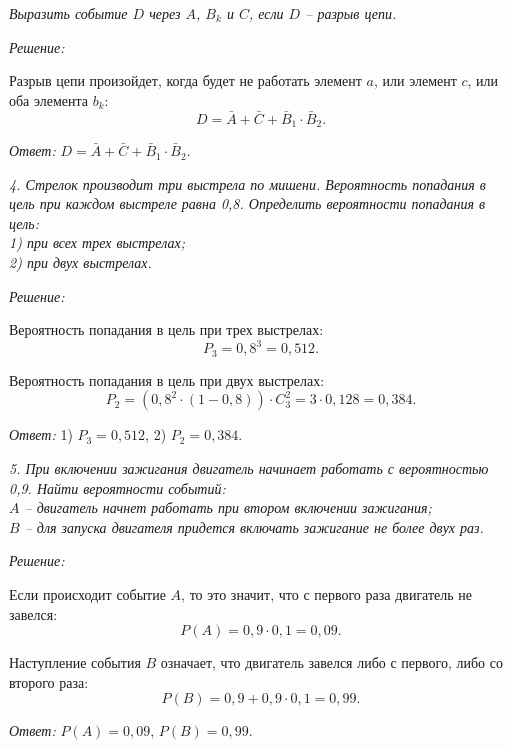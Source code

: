 \emph{Выразить событие \( D \) через \( A \), \( B_k \) и \( C \), если \( D \) -- разрыв цепи.}

\vspace*{1em}
\emph{Решение:}

Разрыв цепи произойдет, когда будет не работать элемент \( a \), или элемент
\( c \), или оба элемента \( b_k \):
\[
    D = \bar{A} + \bar{C} + \bar{B}_1\cdot\bar{B}_2.
\]

\vspace*{1em}
\emph{Ответ:} \( D = \bar{A} + \bar{C} + \bar{B}_1\cdot\bar{B}_2 \).

\vspace*{2em}

\emph{4. Стрелок производит три выстрела по мишени. Вероятность попадания в цель при
каждом выстреле равна 0,8. Определить вероятности попадания в цель: \\
1) при всех трех выстрелах; \\
2) при двух выстрелах.}

\vspace*{2em}
\emph{Решение:}

Вероятность попадания в цель при трех выстрелах:
\[
    P_3 = 0,8^3 = 0,512.
\]

Вероятность попадания в цель при двух выстрелах:
\[
    P_2 = (0,8^2 \cdot (1-0,8))\cdot C_3^2 = 3 \cdot 0,128 = 0,384.
\]

\vspace*{1em}
\emph{Ответ:} 1) \( P_3 = 0,512 \), 2) \( P_2 = 0,384 \).

\pagebreak

\emph{5. При включении зажигания двигатель начинает работать с вероятностью 0,9.
Найти вероятности событий: \\ 
\( A \) -- двигатель начнет работать при втором включении зажигания; \\ 
\( B \) -- для запуска двигателя придется включать зажигание не более двух раз.}

\vspace*{2em}
\emph{Решение:}

Если происходит событие \( A \), то это значит, что с первого раза двигатель не
завелся:
\[
    P(A) = 0,9\cdot 0,1 = 0,09.
\]

Наступление события \( B \) означает, что двигатель завелся либо с первого, либо
со второго раза:
\[
    P(B) = 0,9 + 0,9\cdot 0,1 = 0,99.
\]

\vspace*{2em}
\emph{Ответ:} \( P(A) = 0,09 \), \( P(B) = 0,99 \).

